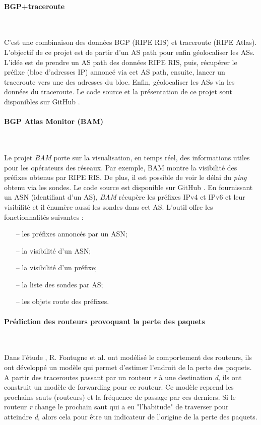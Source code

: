 \paragraph{BGP+traceroute} ~

C'est une combinaison des données BGP (RIPE RIS) et traceroute (RIPE Atlas). L'objectif de ce projet est de partir d'un AS path pour enfin géolocaliser les ASs. 
L'idée est de prendre un AS path des données RIPE RIS, puis, récupérer le préfixe (bloc d'adresses IP) annoncé via cet AS path, ensuite, lancer un traceroute vers une des adresses du bloc. Enfin, géolocaliser les ASs via les données du traceroute. 
Le code source et la présentation de ce projet sont disponibles sur GitHub \cite{bgp-traceroutes,pres-bgp-traceroute}. 


\paragraph{BGP Atlas Monitor (BAM)} ~

Le projet \textit{BAM} porte sur la visualisation, en temps réel,  des informations utiles pour les opérateurs des réseaux. Par exemple, BAM montre  la visibilité des préfixes obtenus par RIPE RIS. De plus,  il est possible de voir  le délai du \textit{ping} obtenu via les sondes. Le code source est disponible sur  GitHub \cite{bam}. En fournissant un ASN (identifiant d'un AS), \textit{BAM} récupère les préfixes IPv4 et IPv6 et leur visibilité et il énumère aussi les sondes dans cet AS. L'outil offre  les  fonctionnalités suivantes :
\begin{itemize}
	\item[--] les préfixes annoncés par un ASN;
	\item[--] la visibilité d'un ASN;
	\item[--] la visibilité d'un préfixe;
	\item[--] la liste des sondes par AS;
	\item[--] les objets  route des préfixes.
\end{itemize}

\paragraph{Prédiction des routeurs provoquant la perte des paquets }~

Dans l'étude \cite{DBLP:journals/corr/FontugneAPB16}, R. Fontugne et al. ont modélisé le comportement  des routeurs, ils ont développé un modèle qui permet d'estimer l'endroit de la  perte des paquets. A partir des traceroutes passant par un routeur \textit{r} à une destination \textit{d}, ils ont construit un modèle de forwarding pour ce routeur. Ce modèle reprend les prochains sauts (routeurs) et la fréquence de passage par ces derniers. Si le routeur \textit{r} change le prochain saut qui a eu "l'habitude" de traverser  pour atteindre \textit{d}, alors cela pour être un indicateur de l'origine  de la perte des paquets.

